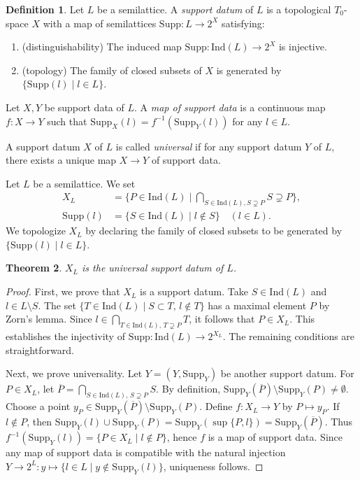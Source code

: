 \documentclass[11pt]{amsart}
\theoremstyle{definition}
\newtheorem{defn}{Definition}[section]
\theoremstyle{plain}
\newtheorem{thm}[defn]{Theorem}
\theoremstyle{remark}
\newcommand{\Ind}{\mathrm{Ind}}
\newcommand{\ol}{\overline}
\newcommand{\Supp}{\mathrm{Supp}}
\numberwithin{equation}{section}
\begin{document}
\begin{defn}
  Let \(L\) be a semilattice.
  A \emph{support datum} of \(L\) is a topological \(T_0\)-space \(X\) with a map of semilattices \(\Supp:L\to 2^X\) satisfying:
  \begin{enumerate}
    \item (distinguishability) The induced map \(\Supp:\Ind(L)\to 2^X\) is injective.
    \item (topology) The family of closed subsets of \(X\) is generated by \(\{\Supp(l)\mid l\in L\}\).
  \end{enumerate}
  Let \(X,Y\) be support data of \(L\).
  A \emph{map of support data} is a continuous map \(f:X\to Y\) such that \(\Supp_X(l)=f^{-1}(\Supp_Y(l))\) for any \(l\in L\).

  A support datum \(X\) of \(L\) is called \emph{universal} if for any support datum \(Y\) of \(L\), there exists a unique map \(X\to Y\) of support data.
\end{defn}

Let \(L\) be a semilattice.
We set
\begin{align*}
X_L&=\{P\in \Ind(L)\mid \bigcap_{S\in \Ind(L), S\supsetneq P}S\supsetneq P\},\\
\Supp(l)&=\{S\in \Ind(L)\mid l\notin S\}\quad (l\in L).
\end{align*}
We topologize \(X_L\) by declaring the family of closed subsets to be generated by \(\{\Supp(l)\mid l\in L\}\).

\begin{thm}
  \(X_L\) is the universal support datum of \(L\).
\end{thm}
\begin{proof}
  First, we prove that \(X_L\) is a support datum.  
Take \(S\in \Ind(L)\) and \(l\in L\setminus S\).  
The set \(\{T\in \Ind(L)\mid S\subset T,\, l\notin T\}\) has a maximal element \(P\) by Zorn’s lemma.  
Since \(l\in \bigcap_{T\in \Ind(L),\, T\supsetneq P}T\), it follows that \(P\in X_L\).  
This establishes the injectivity of \(\Supp:\Ind(L)\to 2^{X_L}\).  
The remaining conditions are straightforward.


  Next, we prove universality.
  Let \(Y=(Y,\Supp_Y)\) be another support datum.
  For \(P\in X_L\), let \(\ol{P}=\bigcap_{S\in \Ind(L),\, S\supsetneq P}S\).
  By definition, \(\Supp_Y(\ol{P})\setminus \Supp_Y(P)\neq \emptyset\).
  Choose a point \(y_P\in \Supp_Y(\ol{P})\setminus \Supp_Y(P)\).
  Define \(f:X_L\to Y\) by \(P\mapsto y_P\).
  If \(l\notin P\), then \(\Supp_Y(l)\cup\Supp_Y(P)=\Supp_Y(\sup\{P,l\})=\Supp_Y(\ol{P})\).
  Thus \(f^{-1}(\Supp_Y(l))=\{P\in X_L\mid l\notin P\}\), hence \(f\) is a map of support data.
  Since any map of support data is compatible with the natural injection \(Y\to 2^L: y\mapsto \{l\in L\mid y\notin \Supp_Y(l)\}\), uniqueness follows.
\end{proof}
\end{document}
